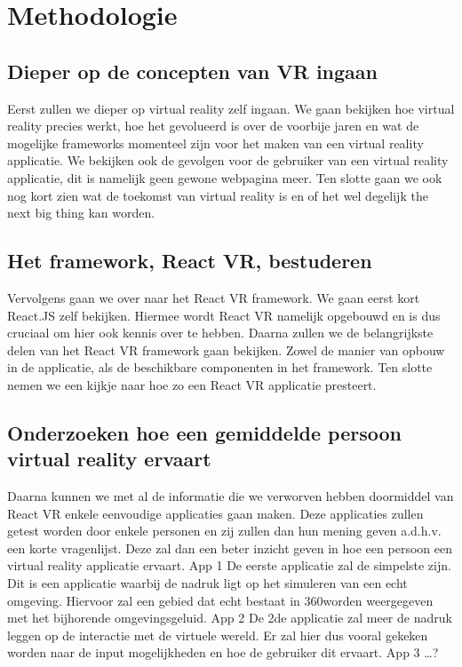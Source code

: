 
\chapter{Methodologie}
\label{ch:methodologie}


\section{Dieper op de concepten van VR ingaan}
Eerst zullen we dieper op virtual reality zelf ingaan. We gaan bekijken hoe virtual reality precies werkt, hoe het gevolueerd is over de voorbije jaren en wat de mogelijke frameworks momenteel zijn voor het maken van een virtual reality applicatie. We bekijken ook de gevolgen voor de gebruiker van een virtual reality applicatie, dit is namelijk geen gewone webpagina meer. Ten slotte gaan we ook nog kort zien wat de toekomst van virtual reality is en of het wel degelijk the next big thing kan worden.

\section{Het framework, React VR, bestuderen}
Vervolgens gaan we over naar het React VR framework. We gaan eerst kort React.JS zelf bekijken. Hiermee wordt React VR namelijk opgebouwd en is dus cruciaal om hier ook kennis over te hebben. Daarna zullen we de belangrijkste delen van het React VR framework gaan bekijken. Zowel de manier van opbouw in de applicatie, als de beschikbare componenten in het framework. Ten slotte nemen we een kijkje naar hoe zo een React VR applicatie presteert.

\section{Onderzoeken hoe een gemiddelde persoon virtual reality ervaart}
Daarna kunnen we met al de informatie die we verworven hebben doormiddel van React VR enkele eenvoudige applicaties gaan maken. Deze applicaties zullen getest worden door enkele personen en zij zullen dan hun mening geven a.d.h.v. een korte vragenlijst. Deze zal dan een beter inzicht geven in hoe een persoon een virtual reality applicatie ervaart.
App 1
De eerste applicatie zal de simpelste zijn. Dit is een applicatie waarbij de nadruk ligt op het simuleren van een echt omgeving. Hiervoor zal een gebied dat echt bestaat in 360\textdegree worden weergegeven met het bijhorende omgevingsgeluid. 
App 2
De 2de applicatie zal meer de nadruk leggen op de interactie met de virtuele wereld. Er zal hier dus vooral gekeken worden naar de input mogelijkheden en hoe de gebruiker dit ervaart.
App 3
…?

